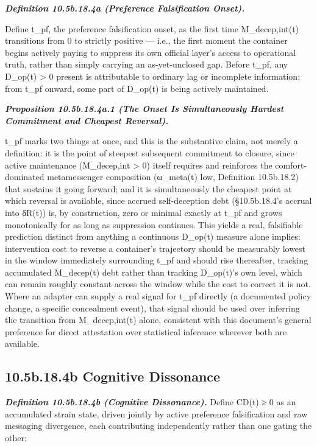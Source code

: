 \documentclass[
]{article}
\begin{document}
\emph{\textbf{Definition 10.5b.18.4a (Preference Falsification Onset).}}

Define t\_pf, the preference falsification onset, as the first time
M\_decep,int(t) transitions from 0 to strictly positive --- i.e., the
first moment the container begins actively paying to suppress its own
official layer's access to operational truth, rather than simply
carrying an as-yet-unclosed gap. Before t\_pf, any D\_op(t)
\textgreater{} 0 present is attributable to ordinary lag or incomplete
information; from t\_pf onward, some part of D\_op(t) is being actively
maintained.

\emph{\textbf{Proposition 10.5b.18.4a.1 (The Onset Is Simultaneously
Hardest Commitment and Cheapest Reversal).}}

t\_pf marks two things at once, and this is the substantive claim, not
merely a definition: it is the point of steepest subsequent commitment
to closure, since active maintenance (M\_decep,int \textgreater{} 0)
itself requires and reinforces the comfort-dominated metamessenger
composition (ω\_meta(t) low, Definition 10.5b.18.2) that sustains it
going forward; and it is simultaneously the cheapest point at which
reversal is available, since accrued self-deception debt (§10.5b.18.4's
accrual into δR(t)) is, by construction, zero or minimal exactly at
t\_pf and grows monotonically for as long as suppression continues. This
yields a real, falsifiable prediction distinct from anything a
continuous D\_op(t) measure alone implies: intervention cost to reverse
a container's trajectory should be measurably lowest in the window
immediately surrounding t\_pf and should rise thereafter, tracking
accumulated M\_decep(t) debt rather than tracking D\_op(t)'s own level,
which can remain roughly constant across the window while the cost to
correct it is not. Where an adapter can supply a real signal for t\_pf
directly (a documented policy change, a specific concealment event),
that signal should be used over inferring the transition from
M\_decep,int(t) alone, consistent with this document's general
preference for direct attestation over statistical inference wherever
both are available.

\hypertarget{b.18.4b-cognitive-dissonance}{%
\subsection{10.5b.18.4b Cognitive
Dissonance}\label{b.18.4b-cognitive-dissonance}}

\emph{\textbf{Definition 10.5b.18.4b (Cognitive Dissonance).}} Define
CD(t) ≥ 0 as an accumulated strain state, driven jointly by active
preference falsification and raw messaging divergence, each contributing
independently rather than one gating the other:
\end{document}
